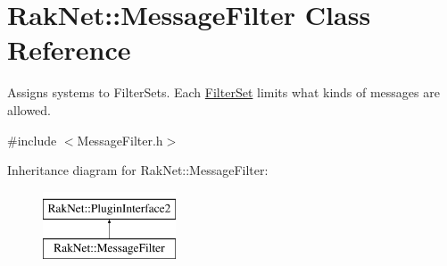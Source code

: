 \hypertarget{class_rak_net_1_1_message_filter}{\section{Rak\-Net\-:\-:Message\-Filter Class Reference}
\label{class_rak_net_1_1_message_filter}
}


Assigns systems to Filter\-Sets. Each \hyperlink{struct_rak_net_1_1_filter_set}{Filter\-Set} limits what kinds of messages are allowed.  




{\ttfamily \#include $<$Message\-Filter.\-h$>$}

Inheritance diagram for Rak\-Net\-:\-:Message\-Filter\-:\begin{figure}[H]
\begin{center}
\leavevmode
\includegraphics[height=2.000000cm]{class_rak_net_1_1_message_filter}
\end{center}
\end{figure}
